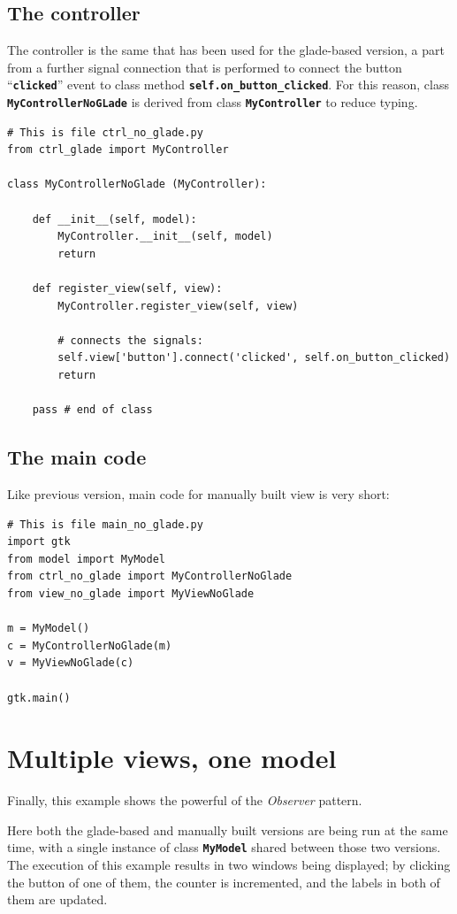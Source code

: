 \documentclass{article}
\newcommand{\kw}[1]{\emph{#1}\xspace}
\newcommand{\obs}{\kw{Observer} pattern\xspace}
\newcommand{\codename}[1]{\texttt{\bfseries \textcolor {codecolor}{#1}}\xspace}
\newcommand{\codesize}{\small \color{codecolor}}
\begin{document}
\subsection{The controller}
The controller is the same that has been used for the glade-based
version, a part from a further signal connection that is performed to
connect the button ``\codename{clicked}'' event to class method
\codename{self.on\_button\_clicked}. For this reason, class
\codename{MyControllerNoGLade} is derived from class
\codename{MyController} to reduce typing.
 
{ \codesize 
\begin{verbatim}   
# This is file ctrl_no_glade.py
from ctrl_glade import MyController

class MyControllerNoGlade (MyController):

    def __init__(self, model):
        MyController.__init__(self, model)
        return

    def register_view(self, view):
        MyController.register_view(self, view)

        # connects the signals:
        self.view['button'].connect('clicked', self.on_button_clicked)
        return    
    
    pass # end of class
\end{verbatim}
} 


\subsection{The main code}
Like previous version, main code for manually built view is very
short:

{ \codesize 
\begin{verbatim}     
# This is file main_no_glade.py
import gtk
from model import MyModel
from ctrl_no_glade import MyControllerNoGlade
from view_no_glade import MyViewNoGlade

m = MyModel()
c = MyControllerNoGlade(m)
v = MyViewNoGlade(c)

gtk.main()
\end{verbatim}
} 

\section{Multiple views, one model}
Finally, this example shows the powerful of the \obs.

Here both the glade-based and manually built versions are being run at
the same time, with a single instance of class \codename{MyModel}
shared between those two versions. The execution of this example
results in two windows being displayed; by clicking the button of one
of them, the counter is incremented, and the labels in both of them
are updated.
\end{document}
